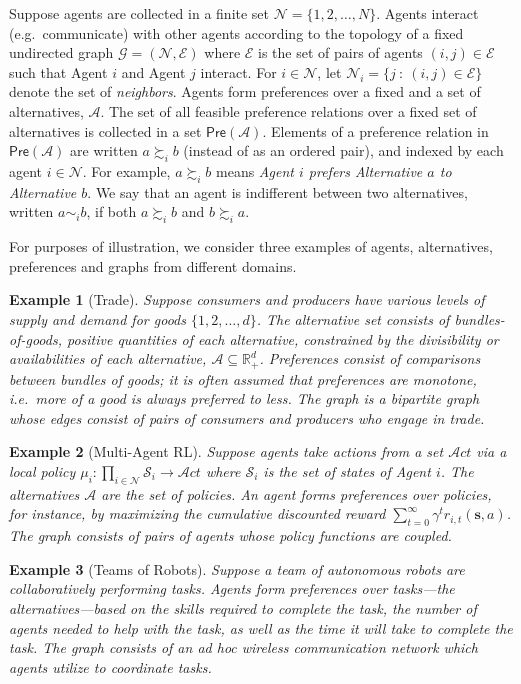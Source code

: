 \documentclass[conference]{ieeeconf}
\newcommand{\R}{\mathbb{R}}
\newcommand{\N}{\mathcal{N}}
\newcommand{\A}{\mathcal{A}}
\renewcommand{\S}{\mathcal{S}}
\newcommand{\E}{\mathcal{E}}
\newcommand{\Pref}{\mathsf{Pre}}
\newcommand{\prefers}{\succsim}
\newcommand{\indif}{\sim}
\newcommand{\graph}{\mathcal{G}}
\newcommand{\Act}{\mathcal{A}ct}
\newtheorem{example}{Example}
\begin{document}
Suppose agents are collected in a finite set $\N = \{1,2,\dots,N\}$. Agents interact (e.g.~communicate) with other agents according to the topology of a fixed undirected graph $\graph = (\N,\E)$ where $\E$ is the set of pairs of agents $(i,j) \in \E$ such that Agent $i$ and Agent $j$ interact. For $i \in \N$, let $\N_i = \{ j~:~(i,j) \in \E\}$ denote the set of \emph{neighbors}. Agents form preferences over a fixed and a set of alternatives, $\A$. The set of all feasible preference relations over a fixed set of alternatives is collected in a set $\Pref(\A)$. Elements of a preference relation in $\Pref(\A)$ are written $a \prefers_i b$ (instead of as an ordered pair), and indexed by each agent $i \in \N$. For example, $a \prefers_i b$ means \emph{Agent $i$ prefers Alternative $a$ to Alternative $b$}. We say that an agent is indifferent between two alternatives, written $a \indif_i b$, if both $a \prefers_i b$ and $b \prefers_i a$.

For purposes of illustration, we consider three examples of agents, alternatives, preferences and graphs from different domains.

\begin{example}[Trade]
    Suppose consumers and producers have various levels of supply and demand for goods $\{1,2,\dots,d\}$. The alternative set consists of  bundles-of-goods, positive quantities of each alternative, constrained by the divisibility or availabilities of each alternative, $\A \subseteq \R^{d}_{+}$. Preferences consist of comparisons between bundles of goods; it is often assumed that preferences are monotone, i.e.~more of a good is always preferred to less. The graph is a bipartite graph whose edges consist of pairs of consumers and producers who engage in trade.
\end{example}
\begin{example}[Multi-Agent RL]
    Suppose agents take actions from a set $\Act$ via a local policy $\mu_i: \prod_{i \in \N} \S_i \to \Act$ where $\S_i$ is the set of states of Agent $i$. The alternatives $\A$ are the set of policies. An agent forms preferences over policies, for instance, by maximizing the cumulative discounted reward $\sum_{t=0}^{\infty} \gamma^t r_{i,t}(\mathbf{s},a)$. The graph consists of pairs of agents whose policy functions are coupled.
\end{example}
\begin{example}[Teams of Robots]
    Suppose a team of autonomous robots are collaboratively performing tasks. Agents form preferences over tasks---the alternatives---based on the skills required to complete the task, the number of agents needed to help with the task, as well as the time it will take to complete the task. The graph consists of an \emph{ad hoc} wireless communication network which agents utilize to coordinate tasks.
\end{example}
\end{document}
